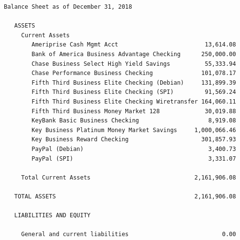 \documentclass[a4paper]{report}
\begin{document}
\begin{verbatim}
Balance Sheet as of December 31, 2018

   ASSETS
     Current Assets
        Ameriprise Cash Mgmt Acct                         13,614.08
        Bank of America Business Advantage Checking      250,000.00
        Chase Business Select High Yield Savings          55,333.94
        Chase Performance Business Checking              101,078.17
        Fifth Third Business Elite Checking (Debian)     131,899.39
        Fifth Third Business Elite Checking (SPI)         91,569.24
        Fifth Third Business Elite Checking Wiretransfer 164,060.11
        Fifth Third Business Money Market 128             30,019.88
        KeyBank Basic Business Checking                    8,919.08
        Key Business Platinum Money Market Savings     1,000,066.46
        Key Business Reward Checking                     301,857.93
        PayPal (Debian)                                    3,400.73
        PayPal (SPI)                                       3,331.07

     Total Current Assets                              2,161,906.08

   TOTAL ASSETS                                        2,161,906.08

   LIABILITIES AND EQUITY

     General and current liabilities                           0.00


\end{verbatim}
\end{document}
